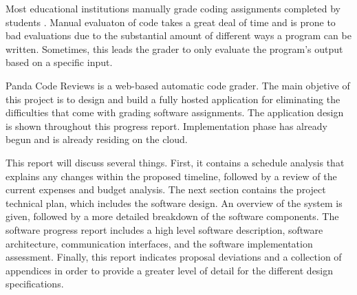 




Most educational institutions manually grade coding assignments completed by
students \cite{}. Manual evaluaton of code takes a great deal of time and is
prone to bad evaluations due to the substantial amount of different ways a
program can be written. Sometimes, this leads the grader to only evaluate the
program's output based on a specific input.

Panda Code Reviews is a web-based automatic code grader. The main objetive of
this project is to design and build a fully hosted application for eliminating
the difficulties that come with grading software assignments. The application
design is shown throughout this progress report. Implementation phase has
already begun and is already residing on the cloud.

This report will discuss several things. First, it contains a schedule analysis
that explains any changes within the proposed timeline, followed by a review of
the current expenses and budget analysis. The next section contains the project
technical plan, which includes the software design. An overview of the system is
given, followed by a more detailed breakdown of the software components. The
software progress report includes a high level software description, software
architecture, communication interfaces, and the software implementation
assessment. Finally, this report indicates proposal deviations and a collection
of appendices in order to provide a greater level of detail for the different
design specifications.
